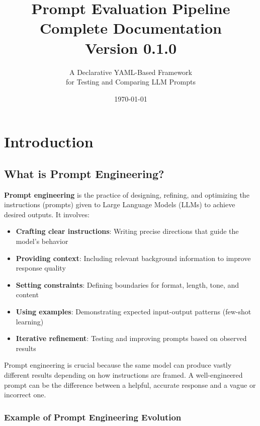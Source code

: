 \documentclass[11pt,a4paper]{report}
\title{
    \vspace{-2cm}
    \textbf{Prompt Evaluation Pipeline}\\
    \vspace{0.5cm}
    \large Complete Documentation\\
    \vspace{0.3cm}
    \normalsize Version 0.1.0
}
\author{
    A Declarative YAML-Based Framework\\
    for Testing and Comparing LLM Prompts
}
\date{\today}
\begin{document}
\maketitle

\tableofcontents

\newpage


\chapter{Introduction}

\section{What is Prompt Engineering?}

\textbf{Prompt engineering} is the practice of designing, refining, and optimizing the instructions (prompts) given to Large Language Models (LLMs) to achieve desired outputs. It involves:

\begin{itemize}
    \item \textbf{Crafting clear instructions}: Writing precise directions that guide the model's behavior
    \item \textbf{Providing context}: Including relevant background information to improve response quality
    \item \textbf{Setting constraints}: Defining boundaries for format, length, tone, and content
    \item \textbf{Using examples}: Demonstrating expected input-output patterns (few-shot learning)
    \item \textbf{Iterative refinement}: Testing and improving prompts based on observed results
\end{itemize}

Prompt engineering is crucial because the same model can produce vastly different results depending on how instructions are framed. A well-engineered prompt can be the difference between a helpful, accurate response and a vague or incorrect one.

\subsection{Example of Prompt Engineering Evolution}
\end{document}
